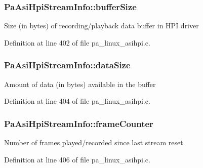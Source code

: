 \subsubsection[{\texorpdfstring{buffer\+Size}{bufferSize}}]{ Pa\+Asi\+Hpi\+Stream\+Info\+::buffer\+Size}\hypertarget{struct_pa_asi_hpi_stream_info_ad112f86fb1b2839cbc0e87bfd8616489}{}\label{struct_pa_asi_hpi_stream_info_ad112f86fb1b2839cbc0e87bfd8616489}
Size (in bytes) of recording/playback data buffer in H\+PI driver 

Definition at line 402 of file pa\+\_\+linux\+\_\+asihpi.\+c.

\subsubsection[{\texorpdfstring{data\+Size}{dataSize}}]{ Pa\+Asi\+Hpi\+Stream\+Info\+::data\+Size}\hypertarget{struct_pa_asi_hpi_stream_info_a5cb756961bf1871b845084759b4bfd0d}{}\label{struct_pa_asi_hpi_stream_info_a5cb756961bf1871b845084759b4bfd0d}
Amount of data (in bytes) available in the buffer 

Definition at line 404 of file pa\+\_\+linux\+\_\+asihpi.\+c.

\subsubsection[{\texorpdfstring{frame\+Counter}{frameCounter}}]{ Pa\+Asi\+Hpi\+Stream\+Info\+::frame\+Counter}\hypertarget{struct_pa_asi_hpi_stream_info_a254075498024c75871b01557c010d9cb}{}\label{struct_pa_asi_hpi_stream_info_a254075498024c75871b01557c010d9cb}
Number of frames played/recorded since last stream reset 

Definition at line 406 of file pa\+\_\+linux\+\_\+asihpi.\+c.

